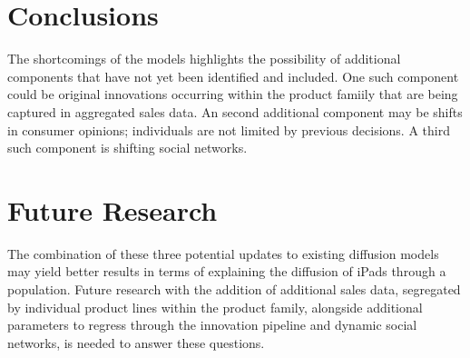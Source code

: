 \documentclass[11pt]{article}
\begin{document}
\section{Conclusions}

The shortcomings of the models highlights the possibility of additional components that have not yet been identified and included. One such component could be original innovations occurring within the product famiily that are being captured in aggregated sales data. An second additional component may be shifts in consumer opinions; individuals are not limited by previous decisions. A third such component is shifting social networks. 

\section{Future Research}

The combination of these three potential updates to existing diffusion models may yield better results in terms of explaining the diffusion of iPads through a population. Future research with the addition of additional sales data, segregated by individual product lines within the product family, alongside additional parameters to regress through the innovation pipeline and dynamic social networks, is needed to answer these questions.




\end{document}
